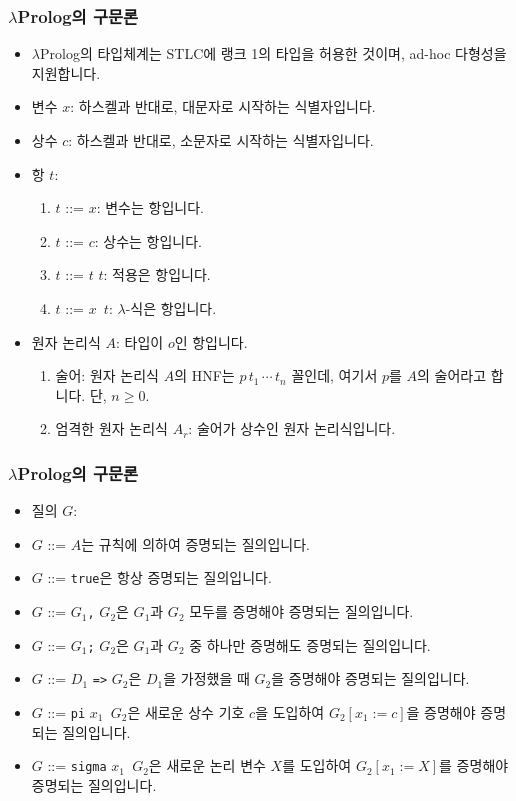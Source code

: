 \documentclass[slidestop,compress,mathserif]{beamer}
\begin{document}
    \begin{frame}
        \frametitle{$\lambda$Prolog의 구문론}
        \begin{itemize}
            \item $\lambda$Prolog의 타입체계는 STLC에 랭크 1의 타입을 허용한 것이며, ad-hoc 다형성을 지원합니다.
            \item 변수 $x$: 하스켈과 반대로, 대문자로 시작하는 식별자입니다.
            \item 상수 $c$: 하스켈과 반대로, 소문자로 시작하는 식별자입니다.
            \item 항 $t$:
            \begin{enumerate}
                \item $t$ ::= $x$: 변수는 항입니다.
                \item $t$ ::= $c$: 상수는 항입니다.
                \item $t$ ::= $t$ $t$: 적용은 항입니다.
                \item $t$ ::= $x$\texttt{\string\ }$t$: $\lambda$-식은 항입니다.
            \end{enumerate}
            \item 원자 논리식 $A$: 타입이 $o$인 항입니다.
            \begin{enumerate}
                \item 술어: 원자 논리식 $A$의 HNF는 $ p \, t_1 \, \cdots \, t_n $ 꼴인데, 여기서 $p$를 $A$의 술어라고 합니다. 단, $n \geq 0$.
                \item 엄격한 원자 논리식 $A_r$: 술어가 상수인 원자 논리식입니다.
            \end{enumerate}
        \end{itemize}
    \end{frame}

    \begin{frame}
        \frametitle{$\lambda$Prolog의 구문론}
        \begin{itemize}
            \item 질의 $G$:
            \item $G$ ::= $A$는 규칙에 의하여 증명되는 질의입니다.
            \item $G$ ::= \texttt{true}은 항상 증명되는 질의입니다.
            \item $G$ ::= $G_1$\texttt{,} $G_2$은 $G_1$과 $G_2$ 모두를 증명해야 증명되는 질의입니다.
            \item $G$ ::= $G_1$\texttt{;} $G_2$은 $G_1$과 $G_2$ 중 하나만 증명해도 증명되는 질의입니다.
            \item $G$ ::= $D_1$ \texttt{=>} $G_2$은 $D_1$을 가정했을 때 $G_2$을 증명해야 증명되는 질의입니다.
            \item $G$ ::= \texttt{pi} $x_1$\texttt{\string\ }$G_2$은 새로운 상수 기호 $c$을 도입하여 $G_2 \left[ x_1 := c \right]$을 증명해야 증명되는 질의입니다.
            \item $G$ ::= \texttt{sigma} $x_1$\texttt{\string\ }$G_2$은 새로운 논리 변수 $X$를 도입하여 $G_2 \left[ x_1 := X \right]$를 증명해야 증명되는 질의입니다.
        \end{itemize}
    \end{frame}
\end{document}
